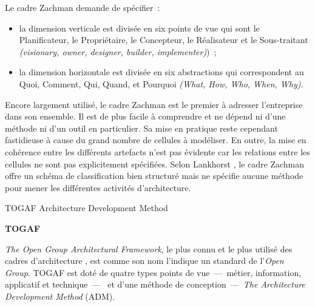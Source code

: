 Le cadre Zachman demande de spécifier~:

	\begin{itemize}

\item la dimension verticale est divisée en six points de vue qui sont le 
Planificateur, le Propriétaire, le Concepteur, le Réalisateur et le 
Sous-traitant \textit{(visionary, owner, designer, builder, implementer)})~;

\item la dimension horizontale est divisée en six abstractions qui correspondent 
au Quoi, Comment, Qui, Quand, et Pourquoi \textit{(What, How, Who, When, Why)}.
	\end{itemize}	

Encore largement utilisé, le cadre Zachman est le premier à adresser 
l'entreprise dans son ensemble. Il est de plus facile à comprendre et ne dépend 
ni d'une méthode ni d'un outil en particulier. Sa mise en pratique reste 
cependant fastidieuse à cause du grand nombre de cellules à modéliser. En outre, 
la mise en cohérence entre les différents artefacts n'est pas évidente car les 
relations entre les cellules ne sont pas explicitement spécifiées. Selon 
Lankhorst \cite{lankhorst2013enterprise}, le cadre Zachman offre un schéma de 
classification bien structuré mais ne spécifie aucune méthode pour mener les 
différentes activités d'architecture.

\begin{table}[!htbp]
 \vspace*{0.4cm}
 
 \caption{TOGAF Architecture Development Method 
\protect\cite{zachman1987framework}}
 \label{fig:Zachman}
\end{table}

\textbf{TOGAF} 

\textit{The Open Group Architectural Framework}, le plus connu et le plus 
utilisé des cadres d'architecture \cite{winter2008enterprise}, est comme son nom 
l'indique un standard de l'\textit{Open Group}. TOGAF est doté de quatre types 
points de vue~—~métier, information, applicatif et technique~—~ et d'une méthode 
de conception~—~\textit{The Architecture Development Method} (ADM). 

